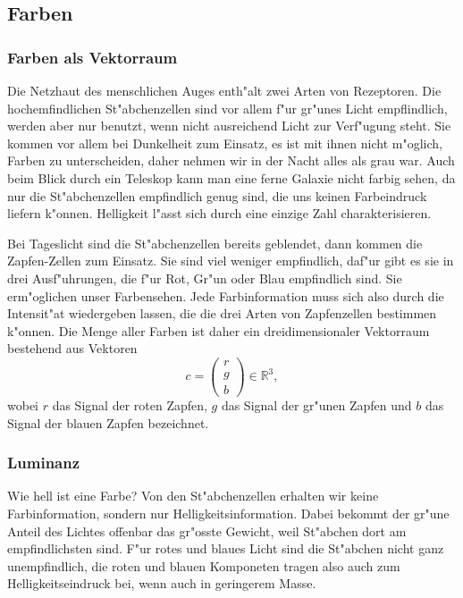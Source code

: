 %
%
%
\subsection{Farben}
\subsubsection{Farben als Vektorraum}
Die Netzhaut des menschlichen Auges enth"alt zwei Arten von Rezeptoren.
Die hochemfindlichen St"abchenzellen sind vor allem f"ur gr"unes Licht
empflindlich, werden aber nur benutzt, wenn nicht ausreichend Licht
zur Verf"ugung steht.
Sie kommen vor allem bei Dunkelheit zum Einsatz, es ist mit ihnen
nicht m"oglich, Farben zu unterscheiden, daher nehmen wir in der
Nacht alles als grau war.
Auch beim Blick durch ein Teleskop kann man eine ferne Galaxie nicht
farbig sehen, da nur die St"abchenzellen empfindlich genug sind, die
uns keinen Farbeindruck liefern k"onnen. Helligkeit l"asst sich durch
eine einzige Zahl charakterisieren.

Bei Tageslicht sind die St"abchenzellen
bereits geblendet, dann kommen die Zapfen-Zellen zum Einsatz.
Sie sind viel weniger empfindlich, daf"ur gibt es sie in drei Ausf"uhrungen,
die f"ur Rot, Gr"un oder Blau empfindlich sind.
Sie erm"oglichen unser Farbensehen.
Jede Farbinformation muss sich also durch die Intensit"at wiedergeben
lassen, die die drei Arten von Zapfenzellen bestimmen k"onnen.
Die Menge aller Farben ist daher ein dreidimensionaler Vektorraum
bestehend aus Vektoren
\[
c=\begin{pmatrix}r\\g\\b\end{pmatrix}
\in\mathbb R^3,
\]
wobei $r$ das Signal der roten Zapfen, $g$ das Signal der gr"unen Zapfen
und $b$ das Signal der blauen Zapfen bezeichnet.

\subsubsection{Luminanz}
Wie hell ist eine Farbe?
Von den St"abchenzellen erhalten wir keine
Farbinformation, sondern nur Helligkeitsinformation.
Dabei bekommt der gr"une Anteil des Lichtes offenbar das
gr"osste Gewicht, weil St"abchen dort am empfindlichsten sind.
F"ur rotes und blaues Licht sind die St"abchen nicht ganz unempfindlich,
die roten und blauen Komponeten tragen also auch zum Helligkeitseindruck
bei, wenn auch in geringerem Masse.

